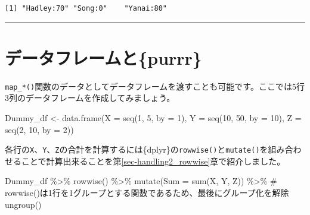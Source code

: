 \documentclass[
  a4paper,
  pandoc,
  ja=standard,
  jafont=haranoaji]{bxjsbook}
\newenvironment{Shaded}{\begin{snugshade}}{\end{snugshade}}
\newcommand{\AttributeTok}[1]{\textcolor[rgb]{0.00,0.48,0.65}{#1}}
\newcommand{\CommentTok}[1]{\textcolor[rgb]{0.37,0.37,0.37}{#1}}
\newcommand{\DecValTok}[1]{\textcolor[rgb]{0.68,0.00,0.00}{#1}}
\newcommand{\FunctionTok}[1]{\textcolor[rgb]{0.28,0.35,0.67}{#1}}
\newcommand{\NormalTok}[1]{\textcolor[rgb]{0.00,0.48,0.65}{#1}}
\newcommand{\OtherTok}[1]{\textcolor[rgb]{0.00,0.48,0.65}{#1}}
\newcommand{\SpecialCharTok}[1]{\textcolor[rgb]{0.37,0.37,0.37}{#1}}
\begin{document}
\begin{verbatim}
[1] "Hadley:70" "Song:0"    "Yanai:80" 
\end{verbatim}

\begin{center}\rule{0.5\linewidth}{0.5pt}\end{center}

\hypertarget{sec-iteration_df}{%
\section{データフレームと\{purrr\}}\label{sec-iteration_df}}

\texttt{map\_*()}関数のデータとしてデータフレームを渡すことも可能です。ここでは5行3列のデータフレームを作成してみましょう。

\begin{Shaded}
\begin{Highlighting}[numbers=left,,]
\NormalTok{Dummy\_df }\OtherTok{\textless{}{-}} \FunctionTok{data.frame}\NormalTok{(}\AttributeTok{X =} \FunctionTok{seq}\NormalTok{(}\DecValTok{1}\NormalTok{,  }\DecValTok{5}\NormalTok{,  }\AttributeTok{by =} \DecValTok{1}\NormalTok{),}
                       \AttributeTok{Y =} \FunctionTok{seq}\NormalTok{(}\DecValTok{10}\NormalTok{, }\DecValTok{50}\NormalTok{, }\AttributeTok{by =} \DecValTok{10}\NormalTok{),}
                       \AttributeTok{Z =} \FunctionTok{seq}\NormalTok{(}\DecValTok{2}\NormalTok{,  }\DecValTok{10}\NormalTok{, }\AttributeTok{by =} \DecValTok{2}\NormalTok{))}
\end{Highlighting}
\end{Shaded}

各行の\texttt{X}、\texttt{Y}、\texttt{Z}の合計を計算するには\{dplyr\}の\texttt{rowwise()}と\texttt{mutate()}を組み合わせることで計算出来ることを第\ref{sec-handling2_rowwise}章で紹介しました。

\begin{Shaded}
\begin{Highlighting}[numbers=left,,]
\NormalTok{Dummy\_df }\SpecialCharTok{\%\textgreater{}\%}
  \FunctionTok{rowwise}\NormalTok{() }\SpecialCharTok{\%\textgreater{}\%}
  \FunctionTok{mutate}\NormalTok{(}\AttributeTok{Sum =} \FunctionTok{sum}\NormalTok{(X, Y, Z)) }\SpecialCharTok{\%\textgreater{}\%}
  \CommentTok{\# rowwise()は1行を1グループとする関数であるため、最後にグループ化を解除}
  \FunctionTok{ungroup}\NormalTok{()}
\end{Highlighting}
\end{Shaded}
\end{document}
